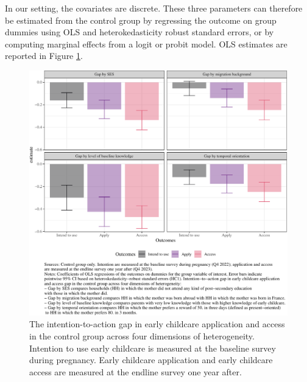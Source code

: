 \documentclass[
]{article}
\begin{document}
In our setting, the covariates are discrete. These three parameters can therefore be estimated from the control group by regressing the outcome on group dummies using OLS and heterokedasticity robust standard errors, or by computing marginal effects from a logit or probit model.
OLS estimates are reported in Figure \ref{fig:AttentionAction}.

\begin{figure}[H]
\includegraphics[width=1\linewidth]{FormalStuff_files/figure-latex/AttentionAction-1} \caption{ The intention-to-action gap in early childcare application and access in the control group across four dimensions of heterogeneity. Intention to use early childcare is measured at the baseline survey during pregnancy. Early childcare application and early childcare access are measured at the endline survey one year after.}\label{fig:AttentionAction}
\end{figure}
\end{document}
